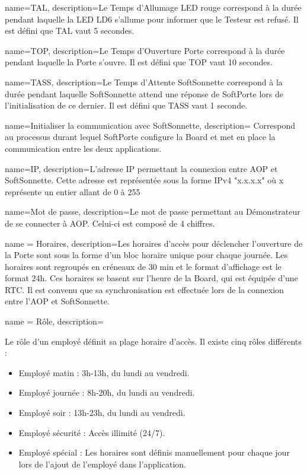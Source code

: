 {
    name={TAL},
    description={\hypertarget{tal}{}Le Temps d'Allumage LED rouge correspond à la durée pendant laquelle la LED LD6 s'allume pour informer que le Testeur est refusé. 
    Il est défini que TAL vaut 5 secondes.}
}

{
    name={TOP},
    description={\hypertarget{top}{}Le Temps d'Ouverture Porte correspond à la durée pendant laquelle la Porte s'ouvre. 
    Il est défini que TOP vaut 10 secondes.}
}

{
    name={TASS},
    description={\hypertarget{tass}{}Le Temps d'Attente SoftSonnette correspond à la durée pendant laquelle SoftSonnette attend une réponse de SoftPorte lors de l'initialisation de ce dernier. 
    Il est défini que TASS vaut 1 seconde.}
}

{
    name={Initialiser la communication avec SoftSonnette},
    description={\hypertarget{initComBoard}{} Correspond au processus durant lequel SoftPorte configure la Board et met en place la communication entre les deux applications.}
}

{
    name={IP},
    description={\hypertarget{IP}{L'adresse} IP permettant la connexion entre AOP et SoftSonnette. 
    Cette adresse est représentée sous la forme IPv4 "x.x.x.x" où x représente un entier allant de 0 à 255}
}

{
    name={Mot de passe},
    description={\hypertarget{mdp}{Le} mot de passe permettant au Démonstrateur de se connecter à AOP. 
    Celui-ci est composé de 4 chiffres.}
}

{
    name = {Horaires},
    description={\hypertarget{hor}{}Les horaires d'accès pour déclencher l'ouverture de la Porte sont sous la forme d'un bloc horaire unique pour chaque journée. 
    Les horaires sont regroupés en créneaux de 30 min et le format d'affichage est le format 24h.
    Ces horaires se basent sur l'heure de la Board, qui est équipée d'une RTC.
    Il est convenu que sa synchronisation est effectuée lors de la connexion entre l'AOP et SoftSonnette.}
}

{
    name = {Rôle},
    description={\hypertarget{rol}{}Le rôle d'un employé définit sa plage horaire d'accès.
    Il existe cinq rôles différents : 
    \begin{itemize}
        \item Employé matin : 3h-13h, du lundi au vendredi.
        \item Employé journée : 8h-20h, du lundi au vendredi.
        \item Employé soir : 13h-23h, du lundi au vendredi.
        \item Employé sécurité : Accès illimité (24/7).
        \item Employé spécial : Les horaires sont définis manuellement pour chaque jour lors de l'ajout de l'employé dans l'application. 
    \end{itemize}
    }
}

